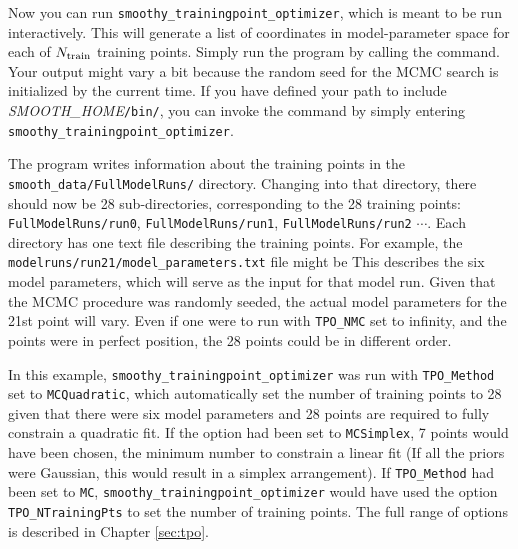 \documentclass[UserManual.tex]{subfiles}
\begin{document}
\begin{sloppypar}
Now you can run {\tt smoothy\_trainingpoint\_optimizer}, which is meant to be run interactively. This will generate a list of coordinates in model-parameter space for each of $N_{\rm train}$ training points. Simply run the program by calling the command. 
\vspace*{-8pt}
Your output might vary a bit because the random seed for the MCMC search is initialized by the current time. If you have defined your path to include \textit{SMOOTH\_HOME}{\tt /bin/}, you can invoke the command by simply entering {\tt smoothy\_trainingpoint\_optimizer}.

The program writes information about the training points in the {\tt smooth\_data/FullModelRuns/} directory. Changing into that directory, there should now be 28 sub-directories, corresponding to the 28 training points: {\tt FullModelRuns/run0}, {\tt FullModelRuns/run1}, {\tt FullModelRuns/run2} $\cdots$. Each directory has one text file describing the training points. For example, the {\tt modelruns/run21/model\_parameters.txt} file might be 
\vspace*{-8pt}{\tt \begin{Verbatim}[commandchars=\\\{\}]
par0 -39.9912
par1 -37.1959
par2 -106.002
par3 -47.4565
par4 -21.0126
par5 -83.7985
\end{Verbatim}
}\vspace*{-8pt}
This describes the six model parameters, which will serve as the input for that model run. Given that the MCMC procedure was randomly seeded, the actual model parameters for the 21st point will vary. Even if one were to run with {\tt TPO\_NMC} set to infinity, and the points were in perfect position, the 28 points could be in different order.

In this example, {\tt smoothy\_trainingpoint\_optimizer} was run with {\tt TPO\_Method} set to {\tt MCQuadratic}, which automatically set the number of training points to 28 given that there were six model parameters and 28 points are required to fully constrain a quadratic fit. If the option had been set to {\tt MCSimplex}, 7 points would have been chosen, the minimum number to constrain a linear fit (If all the priors were Gaussian, this would result in a simplex arrangement). If {\tt TPO\_Method} had been set to {\tt MC}, {\tt smoothy\_trainingpoint\_optimizer} would have used the option {\tt TPO\_NTrainingPts} to set the number of training points. The full range of options is described in Chapter \ref{sec:tpo}.


\end{sloppypar}
\end{document}
